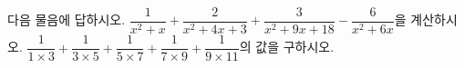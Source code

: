다음 물음에 답하시오.
 $\dfrac{1}{x^2+x}+\dfrac{2}{x^2+4x+3}+\dfrac{3}{x^2+9x+18}-\dfrac{6}{x^2+6x}$을 \mbox{계산하시오.}
 $\dfrac{1}{1\times 3}+\dfrac{1}{3\times 5}+\dfrac{1}{5\times 7}+\dfrac{1}{7\times 9}+\dfrac{1}{9\times 11}$의 값을 \mbox{구하시오.}
